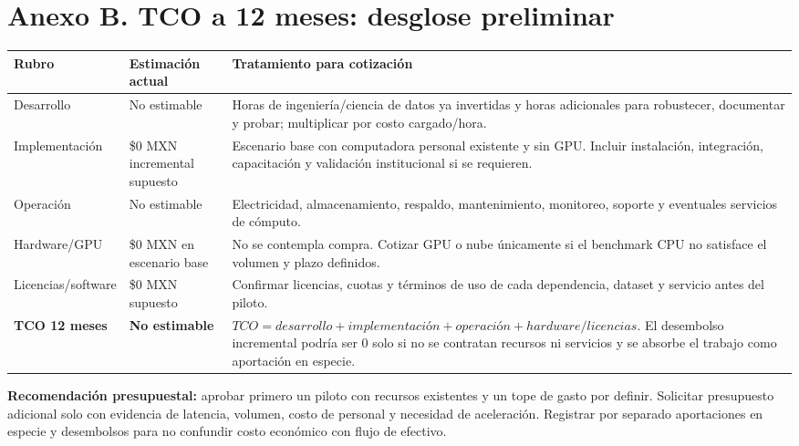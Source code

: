 \documentclass[letterpaper,11pt]{article}
\begin{document}
\section*{Anexo B. TCO a 12 meses: desglose preliminar}
\begin{tabularx}{\linewidth}{p{3.0cm}p{2.6cm}X}
\toprule\textbf{Rubro} & \textbf{Estimación actual} & \textbf{Tratamiento para cotización}\\\midrule
Desarrollo & No estimable & Horas de ingeniería/ciencia de datos ya invertidas y horas adicionales para robustecer, documentar y probar; multiplicar por costo cargado/hora.\\
Implementación & \$0 MXN incremental supuesto & Escenario base con computadora personal existente y sin GPU. Incluir instalación, integración, capacitación y validación institucional si se requieren.\\
Operación & No estimable & Electricidad, almacenamiento, respaldo, mantenimiento, monitoreo, soporte y eventuales servicios de cómputo.\\
Hardware/GPU & \$0 MXN en escenario base & No se contempla compra. Cotizar GPU o nube únicamente si el benchmark CPU no satisface el volumen y plazo definidos.\\
Licencias/software & \$0 MXN supuesto & Confirmar licencias, cuotas y términos de uso de cada dependencia, dataset y servicio antes del piloto.\\
\midrule
\textbf{TCO 12 meses} & \textbf{No estimable} & $TCO=desarrollo+implementación+operación+hardware/licencias$. El desembolso incremental podría ser $0$ solo si no se contratan recursos ni servicios y se absorbe el trabajo como aportación en especie.\\
\bottomrule
\end{tabularx}
\vspace{4pt}
\textbf{Recomendación presupuestal:} aprobar primero un piloto con recursos existentes y un tope de gasto por definir. Solicitar presupuesto adicional solo con evidencia de latencia, volumen, costo de personal y necesidad de aceleración. Registrar por separado aportaciones en especie y desembolsos para no confundir costo económico con flujo de efectivo.\par
\end{document}
